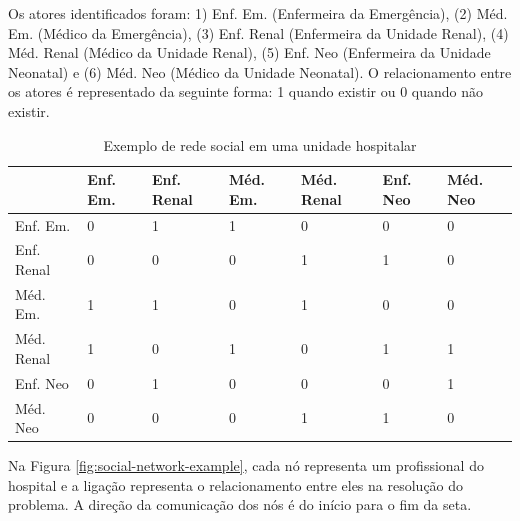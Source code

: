 Os atores identificados foram: 1) Enf. Em. (Enfermeira da Emergência), (2) Méd. Em. (Médico da Emergência), (3) Enf. Renal (Enfermeira da Unidade Renal), (4) Méd. Renal (Médico da Unidade Renal), (5) Enf. Neo (Enfermeira da Unidade Neonatal) e (6) Méd. Neo (Médico da Unidade Neonatal). O relacionamento entre os atores é representado da seguinte forma: 1 quando existir ou 0 quando não existir.

\begin{table}[htbp]
\centering
\caption{Exemplo de rede social em uma unidade hospitalar}
\label{table:social-network-example}
\begin{tabular}{|l|l|l|l|l|l|l|}
\hline
                                      & Enf. Em. & Enf. Renal & Méd. Em. & Méd. Renal & Enf. Neo & Méd. Neo \\ \hline
Enf. Em.                 & 0                     & 1                                   & 1                 & 0                       & 0                                     & 0                                 \\ \hline
Enf. Renal   & 0                     & 0                                   & 0                 & 1                       & 1                                     & 0                                 \\ \hline
Méd. Em.                     & 1                     & 1                                   & 0                 & 1                       & 0                                     & 0                                 \\ \hline
Méd. Renal               & 1                     & 0                                   & 1                 & 0                       & 1                                     & 1                                 \\ \hline
Enf. Neo & 0                     & 1                                   & 0                 & 0                       & 0                                     & 1                                 \\ \hline
Méd. Neo     & 0                     & 0                                   & 0                 & 1                       & 1                                     & 0                                 \\ \hline
\end{tabular}
\end{table}

Na Figura \ref{fig:social-network-example}, cada nó representa um profissional do hospital e a ligação representa o relacionamento entre eles na resolução do problema. A direção da comunicação dos nós é do início para o fim da seta.

